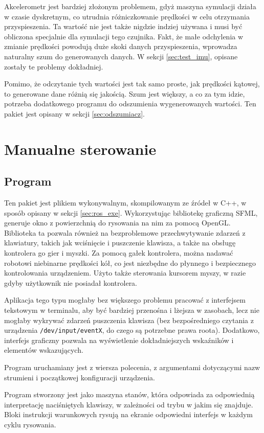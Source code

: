 	Akcelerometr jest bardziej złożonym problemem, gdyż maszyna symulacji działa w czasie dyskretnym, co utrudnia różniczkowanie prędkości w celu otrzymania przyspieszenia.
	Ta wartość nie jest także nigdzie indziej używana i musi być obliczona specjalnie dla symulacji tego czujnika.
	Fakt, że małe odchylenia w zmianie prędkości powodują duże skoki danych przyspieszenia, wprowadza naturalny szum do generowanych danych.
	W sekcji \ref{sec:test_imu}, opisane zostały te problemy dokładniej.
	
	Pomimo, że odczytanie tych wartości jest tak samo proste, jak prędkości kątowej, to generowane dane różnią się jakością.
	Szum jest większy, a co za tym idzie, potrzeba dodatkowego programu do odszumienia wygenerowanych wartości.
	Ten pakiet jest opisany w sekcji \ref{sec:odszumiacz}.
	
\section{Manualne sterowanie}
	\subsection{Program}
		Ten pakiet jest plikiem wykonywalnym, skompilowanym ze źródeł w C++, w sposób opisany w sekcji \ref{sec:ros_exe}.
		Wykorzystując bibliotekę graficzną SFML, generuje okno z powierzchnią do rysowania na nim za pomocą OpenGL.
		Biblioteka ta pozwala również na bezproblemowe przechwytywanie zdarzeń z klawiatury, takich jak wciśnięcie i puszczenie klawisza, a także na obsługę kontrolera go gier i myszki.
		Za pomocą gałek kontrolera, można nadawać robotowi niebinarne prędkości kół, co jest niezbędne do płynnego i bezpiecznego kontrolowania urządzeniem.
		Użyto także sterowania kursorem myszy, w razie gdyby użytkownik nie posiadał kontrolera.
		
		Aplikacja tego typu mogłaby bez większego problemu pracować z interfejsem tekstowym w terminalu, aby być bardziej przenośna i lżejsza w zasobach, 
		lecz nie mogłaby wykrywać zdarzeń puszczenia klawisza
		(bez bezpośredniego czytania z urządzenia \texttt{/dev/input/eventX}, do czego są potrzebne prawa roota). 
		Dodatkowo, interfejs graficzny pozwala na wyświetlenie dokładniejszych wskaźników i elementów wskazujących.
		
		Program uruchamiany jest z wiersza polecenia, z argumentami dotyczącymi nazw strumieni i początkowej konfiguracji urządzenia.
		
		Program stworzony jest jako maszyna stanów, która odpowiada za odpowiednią interpretację naciśniętych klawiszy, w zależności od trybu w jakim się znajduje.
		Bloki instrukcji warunkowych rysują na ekranie odpowiedni interfejs w każdym cyklu rysowania.
	
